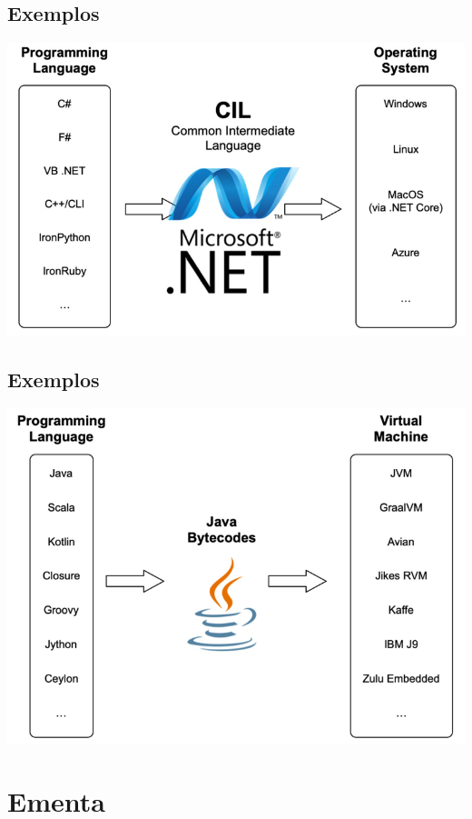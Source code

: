 \documentclass[11pt]{article}
\begin{document}
\subsection*{Exemplos}
\label{sec:org4d611ae}

\begin{center}
\includegraphics[width=.9\linewidth]{ net.png}
\end{center}
\subsection*{Exemplos}
\label{sec:org14fc241}

\begin{center}
\includegraphics[width=.9\linewidth]{ java.png}
\end{center}
\section*{Ementa}
\label{sec:org3017216}
\end{document}

